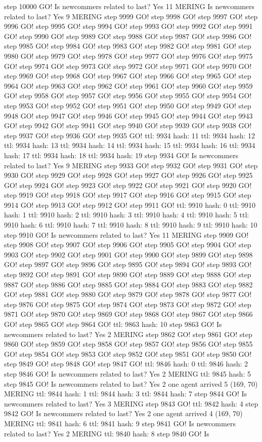 step 10000 GO! Is newcommers related to last? Yes 11 MERING Is newcommers related to last? Yes 9 MERING step 9999 GO! step 9998 GO! step 9997 GO! step 9996 GO! step 9995 GO! step 9994 GO! step 9993 GO! step 9992 GO! step 9991 GO! step 9990 GO! step 9989 GO! step 9988 GO! step 9987 GO! step 9986 GO! step 9985 GO! step 9984 GO! step 9983 GO! step 9982 GO! step 9981 GO! step 9980 GO! step 9979 GO! step 9978 GO! step 9977 GO! step 9976 GO! step 9975 GO! step 9974 GO! step 9973 GO! step 9972 GO! step 9971 GO! step 9970 GO! step 9969 GO! step 9968 GO! step 9967 GO! step 9966 GO! step 9965 GO! step 9964 GO! step 9963 GO! step 9962 GO! step 9961 GO! step 9960 GO! step 9959 GO! step 9958 GO! step 9957 GO! step 9956 GO! step 9955 GO! step 9954 GO! step 9953 GO! step 9952 GO! step 9951 GO! step 9950 GO! step 9949 GO! step 9948 GO! step 9947 GO! step 9946 GO! step 9945 GO! step 9944 GO! step 9943 GO! step 9942 GO! step 9941 GO! step 9940 GO! step 9939 GO! step 9938 GO! step 9937 GO! step 9936 GO! step 9935 GO! ttl: 9934 hash: 11 ttl: 9934 hash: 12 ttl: 9934 hash: 13 ttl: 9934 hash: 14 ttl: 9934 hash: 15 ttl: 9934 hash: 16 ttl: 9934 hash: 17 ttl: 9934 hash: 18 ttl: 9934 hash: 19 step 9934 GO! Is newcommers related to last? Yes 9 MERING step 9933 GO! step 9932 GO! step 9931 GO! step 9930 GO! step 9929 GO! step 9928 GO! step 9927 GO! step 9926 GO! step 9925 GO! step 9924 GO! step 9923 GO! step 9922 GO! step 9921 GO! step 9920 GO! step 9919 GO! step 9918 GO! step 9917 GO! step 9916 GO! step 9915 GO! step 9914 GO! step 9913 GO! step 9912 GO! step 9911 GO! ttl: 9910 hash: 0 ttl: 9910 hash: 1 ttl: 9910 hash: 2 ttl: 9910 hash: 3 ttl: 9910 hash: 4 ttl: 9910 hash: 5 ttl: 9910 hash: 6 ttl: 9910 hash: 7 ttl: 9910 hash: 8 ttl: 9910 hash: 9 ttl: 9910 hash: 10 step 9910 GO! Is newcommers related to last? Yes 11 MERING step 9909 GO! step 9908 GO! step 9907 GO! step 9906 GO! step 9905 GO! step 9904 GO! step 9903 GO! step 9902 GO! step 9901 GO! step 9900 GO! step 9899 GO! step 9898 GO! step 9897 GO! step 9896 GO! step 9895 GO! step 9894 GO! step 9893 GO! step 9892 GO! step 9891 GO! step 9890 GO! step 9889 GO! step 9888 GO! step 9887 GO! step 9886 GO! step 9885 GO! step 9884 GO! step 9883 GO! step 9882 GO! step 9881 GO! step 9880 GO! step 9879 GO! step 9878 GO! step 9877 GO! step 9876 GO! step 9875 GO! step 9874 GO! step 9873 GO! step 9872 GO! step 9871 GO! step 9870 GO! step 9869 GO! step 9868 GO! step 9867 GO! step 9866 GO! step 9865 GO! step 9864 GO! ttl: 9863 hash: 10 step 9863 GO! Is newcommers related to last? Yes 2 MERING step 9862 GO! step 9861 GO! step 9860 GO! step 9859 GO! step 9858 GO! step 9857 GO! step 9856 GO! step 9855 GO! step 9854 GO! step 9853 GO! step 9852 GO! step 9851 GO! step 9850 GO! step 9849 GO! step 9848 GO! step 9847 GO! ttl: 9846 hash: 0 ttl: 9846 hash: 2 step 9846 GO! Is newcommers related to last? Yes 2 MERING ttl: 9845 hash: 5 step 9845 GO! Is newcommers related to last? Yes 2 one agent arrived 5 (169, 70) MERING ttl: 9844 hash: 1 ttl: 9844 hash: 3 ttl: 9844 hash: 7 step 9844 GO! Is newcommers related to last? Yes 3 MERING step 9843 GO! ttl: 9842 hash: 4 step 9842 GO! Is newcommers related to last? Yes 2 one agent arrived 4 (169, 70) MERING ttl: 9841 hash: 6 ttl: 9841 hash: 9 step 9841 GO! Is newcommers related to last? Yes 2 MERING ttl: 9840 hash: 8 step 9840 GO! Is 
